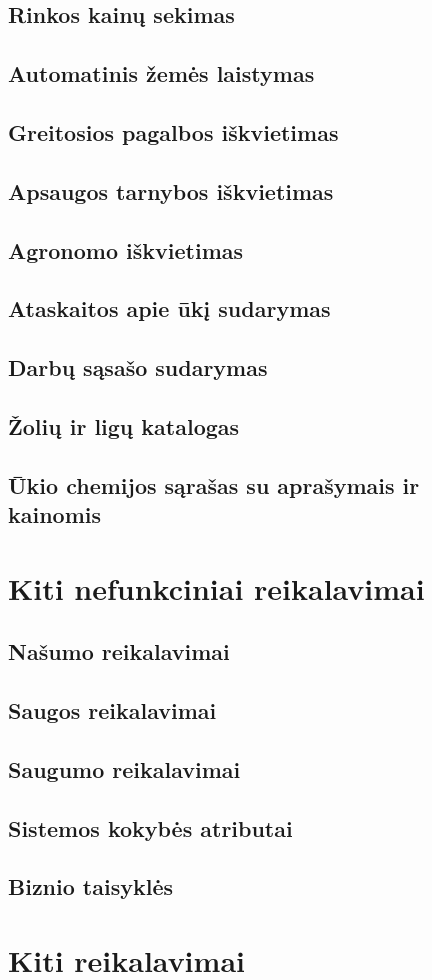 \documentclass[oneside]{VUMIFPSkursinis}
\begin{document}
\subsection{Rinkos kainų sekimas}
\subsection{Automatinis žemės laistymas}
\subsection{Greitosios pagalbos iškvietimas}
\subsection{Apsaugos tarnybos iškvietimas}
\subsection{Agronomo iškvietimas}
\subsection{Ataskaitos apie ūkį sudarymas}
\subsection{Darbų sąsašo sudarymas}
\subsection{Žolių ir ligų katalogas}
\subsection{Ūkio chemijos sąrašas su aprašymais ir kainomis}

\section{Kiti nefunkciniai reikalavimai}
\subsection{Našumo reikalavimai}
\subsection{Saugos reikalavimai}
\subsection{Saugumo reikalavimai}
\subsection{Sistemos kokybės atributai}
\subsection{Biznio taisyklės}

\section{Kiti reikalavimai}
\end{document}

